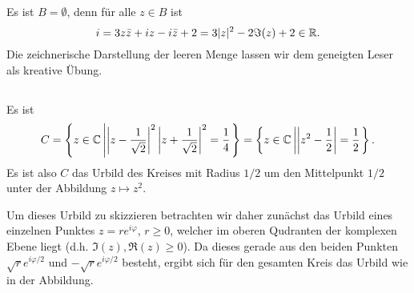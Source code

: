 \documentclass[a4paper,10pt]{article}
\begin{document}
\begin{center}
\end{center}


\subsection{}
Es ist $B = \emptyset$, denn für alle $z \in B$ ist
\[
 i = 3z\bar{z}+iz-i\bar{z}+2 = 3|z|^2 -2\Im(z) +2 \in \mathbb{R}.
\]
Die zeichnerische Darstellung der leeren Menge lassen wir dem geneigten Leser als kreative Übung.


\subsection{}
Es ist
\[
 C
 = \left\{z \in \mathbb{C} \left| \left|z-\frac{1}{\sqrt{2}}\right|^2 \left|z+\frac{1}{\sqrt{2}}\right|^2 = \frac{1}{4} \right.\right\}
 = \left\{z \in \mathbb{C} \left| \left|z^2-\frac{1}{2}\right| = \frac{1}{2} \right.\right\}.
\]
Es ist also $C$ das Urbild des Kreises mit Radius $1/2$ um den Mittelpunkt $1/2$ unter der Abbildung $z \mapsto z^2$.

Um dieses Urbild zu skizzieren betrachten wir daher zunächst das Urbild eines einzelnen Punktes $z = r e^{i\varphi}$, $r \geq 0$, welcher im oberen Qudranten der komplexen Ebene liegt (d.h. $\Im(z), \Re(z) \geq 0$). Da dieses gerade aus den beiden Punkten $\sqrt{r} e^{i\varphi/2}$ und $-\sqrt{r}e^{i\varphi/2}$ besteht, ergibt sich für den gesamten Kreis das Urbild wie in der Abbildung.
\end{document}
